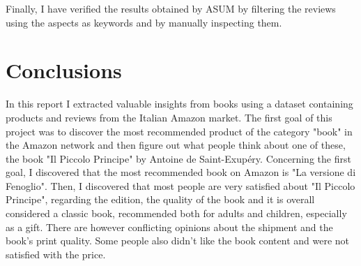 \documentclass[a4paper,12pt]{article}
\begin{document}
\noindent Finally, I have verified the results obtained by ASUM by filtering the reviews using the aspects as keywords and by manually inspecting them. 
\newpage
\section{Conclusions}
\noindent In this report I extracted valuable insights from books using a dataset containing products and reviews from the Italian Amazon market. The first goal of this project was to discover the most recommended product of the category "book" in the Amazon network and then figure out what people think about one of these, the book "Il Piccolo Principe" by Antoine de Saint-Exupéry. Concerning the first goal, I discovered that the most recommended book on Amazon is "La versione di Fenoglio". Then, I discovered that most people are very satisfied about "Il Piccolo Principe", regarding the edition, the quality of the book and it is overall considered a classic book, recommended both for adults and children, especially as a gift. There are however conflicting opinions about the shipment and the book's print quality. Some people also didn't like the book content and were not satisfied with the price.
\end{document}
